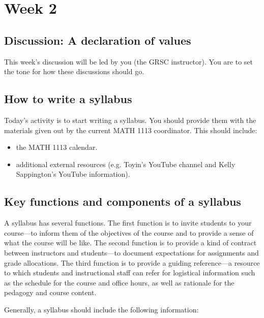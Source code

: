 
\section{Week 2}
\label{sec:week-2}

\subsection{Discussion: A declaration of values}
\label{sec:disc-decl-valu}

This week's discussion will be led by you (the GRSC instructor).  You are to set the tone for how these discussions should go.

\subsection{How to write a syllabus}
\label{sec:how-write-syllabus}

Today's activity is to start writing a syllabus.  You should provide them with the materials given out by the current MATH 1113 coordinator.  This should include:
\begin{itemize}
\item the MATH 1113 calendar.
\item additional external resources (e.g. Toyin's YouTube channel and Kelly Sappington's YouTube information).
\end{itemize}

\subsection{Key functions and components of a syllabus}
\label{sec:key-funct-comp}

A syllabus has several functions. The first function is to invite students to your course—to inform them of the objectives of the course and to provide a sense of what the course will be like. The second function is to provide a kind of contract between instructors and students—to document expectations for assignments and grade allocations. The third function is to provide a guiding reference—a resource to which students and instructional staff can refer for logistical information such as the schedule for the course and office hours, as well as rationale for the pedagogy and course content.

Generally, a syllabus should include the following information:

